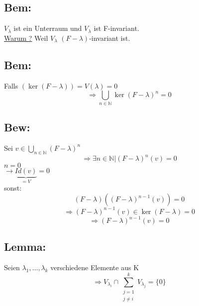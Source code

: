 \documentclass[titlepage,12pt,a4paper,ngerman]{report}
\newcommand{\ub}[1]{\underbrace{#1}}
\begin{document}
\subsection{Bem:}
$V_\lambda$ ist ein Unterraum und $V_\lambda$ ist F-invariant.\\
\underline{Warum ?} Weil $V_\lambda$ $(F-\lambda)$-invariant ist.
\subsection{Bem:} Falls $(\ker(F-\lambda))= V(\lambda) = 0$
$$\Rightarrow \bigcup_{n\in \mathbb{N}} \ker(F-\lambda)^n = 0$$
\subsection{Bew:}
Sei $v \in \bigcup_{n \in \mathbb{N}}(F-\lambda)^n$
$$\Rightarrow \exists n \in \mathbb{N} | (F-\lambda)^n(v) = 0$$
$n=0$\\
$\rightarrow \ub{Id(v)}_{=V} = 0$\\
sonst: $$(F-\lambda)((F-\lambda)^{n-1}(v)) = 0$$
$$\Rightarrow (F-\lambda)^{n-1}(v) \in \ker(F-\lambda) = 0$$
$$\Rightarrow (F-\lambda)^{n-1}(v) = 0$$
\subsection{Lemma:}
Seien $\lambda_1,\dots, \lambda_k$ verschiedene Elemente aus K
$$\Rightarrow V_{\lambda_i} \cap \sum^k_{\substack{ j=1 \\ j \neq i}} V_{\lambda_j} = \{0\}$$
\end{document}
